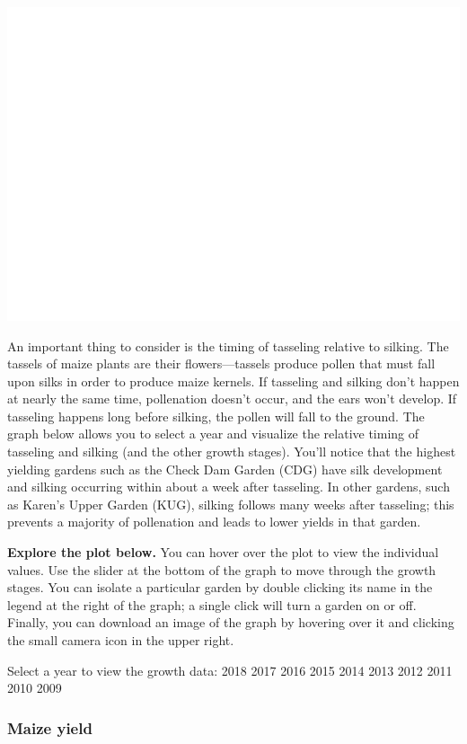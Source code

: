 \documentclass[12pt,]{article}
\begin{document}
\includegraphics{images/growth-summary-data-1.pdf}

An important thing to consider is the timing of tasseling relative to silking. The tassels of maize plants are their flowers---tassels produce pollen that must fall upon silks in order to produce maize kernels. If tasseling and silking don't happen at nearly the same time, pollenation doesn't occur, and the ears won't develop. If tasseling happens long before silking, the pollen will fall to the ground. The graph below allows you to select a year and visualize the relative timing of tasseling and silking (and the other growth stages). You'll notice that the highest yielding gardens such as the Check Dam Garden (CDG) have silk development and silking occurring within about a week after tasseling. In other gardens, such as Karen's Upper Garden (KUG), silking follows many weeks after tasseling; this prevents a majority of pollenation and leads to lower yields in that garden.

\textbf{Explore the plot below.} You can hover over the plot to view the individual values. Use the slider at the bottom of the graph to move through the growth stages. You can isolate a particular garden by double clicking its name in the legend at the right of the graph; a single click will turn a garden on or off. Finally, you can download an image of the graph by hovering over it and clicking the small camera icon in the upper right.

Select a year to view the growth data:
2018
2017
2016
2015
2014
2013
2012
2011
2010
2009

\hypertarget{maize-yield}{%
\subsubsection*{Maize yield}\label{maize-yield}}
\end{document}
